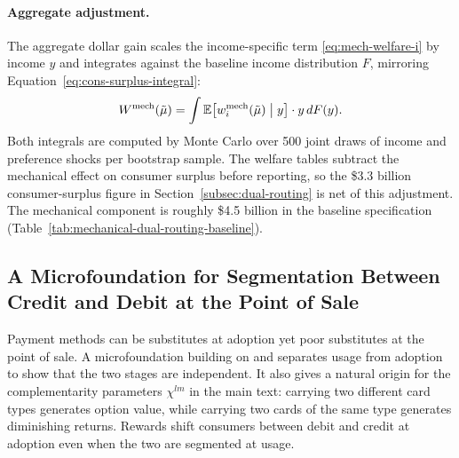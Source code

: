 \documentclass[main.tex]{subfiles}
\begin{document}
\paragraph{Aggregate adjustment.}
The aggregate dollar gain scales the income-specific term \eqref{eq:mech-welfare-i} by income $y$ and integrates against the baseline income distribution $F$, mirroring Equation~\ref{eq:cons-surplus-integral}:
\begin{equation}
    W^{\text{mech}}(\tilde{\mu}) = \int \mathbb{E}\bigl[w^{\text{mech}}_i(\tilde{\mu}) \bigm| y\bigr] \cdot y \, dF(y).
    \label{eq:mech-welfare}
\end{equation}
Both integrals are computed by Monte Carlo over 500 joint draws of income and preference shocks per bootstrap sample.
The welfare tables subtract the mechanical effect on consumer surplus before reporting, so the \$3.3 billion consumer-surplus figure in Section~\ref{subsec:dual-routing} is net of this adjustment. The mechanical component is roughly \$4.5 billion in the baseline specification (Table~\ref{tab:mechanical-dual-routing-baseline}).

\begin{table}[ht!]
    \centering
    \caption{Mechanical dual routing welfare adjustment}
    \label{tab:mechanical-dual-routing-baseline}
    
\end{table}

\clearpage

\subsection{A Microfoundation for Segmentation Between Credit and Debit at the Point of Sale}
\label{subsec:oa-usage-microfoundation}

Payment methods can be substitutes at adoption yet poor substitutes at the point of sale.
A microfoundation building on \textcite{Koulayev.etal2016} and \textcite{Huynh.etal2022} separates usage from adoption to show that the two stages are independent.
It also gives a natural origin for the complementarity parameters $\chi^{lm}$ in the main text: carrying two different card types generates option value, while carrying two cards of the same type generates diminishing returns.
Rewards shift consumers between debit and credit at adoption even when the two are segmented at usage.
\end{document}
